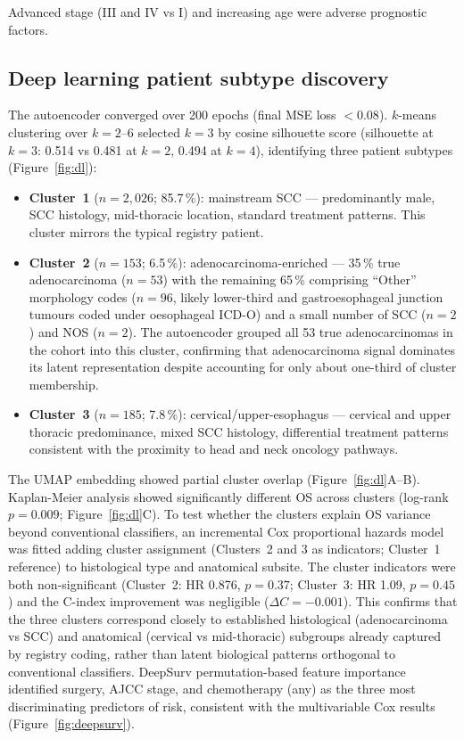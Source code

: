 \documentclass[12pt,a4paper]{article}
\begin{document}
Advanced stage (III and IV vs I) and increasing age were adverse
prognostic factors.

\subsection{Deep learning patient subtype discovery}
\label{sec:dl}
The autoencoder converged over 200 epochs (final MSE loss $< 0.08$).
$k$-means clustering over $k = 2$--6 selected $k = 3$ by cosine
silhouette score (silhouette at $k = 3$: 0.514 vs 0.481 at $k = 2$,
0.494 at $k = 4$), identifying three patient subtypes (Figure~\ref{fig:dl}):

\begin{itemize}[noitemsep]
  \item \textbf{Cluster~1} ($n = 2{,}026$; 85.7\,\%): mainstream SCC ---
    predominantly male, SCC histology, mid-thoracic location, standard
    treatment patterns. This cluster mirrors the typical registry
    patient.
  \item \textbf{Cluster~2} ($n = 153$; 6.5\,\%): adenocarcinoma-enriched
    --- 35\,\% true adenocarcinoma ($n = 53$) with the remaining 65\,\%
    comprising ``Other'' morphology codes ($n = 96$, likely lower-third
    and gastroesophageal junction tumours coded under oesophageal ICD-O)
    and a small number of SCC ($n = 2$) and NOS ($n = 2$). The
    autoencoder grouped all 53 true adenocarcinomas in the cohort into
    this cluster, confirming that adenocarcinoma signal dominates its
    latent representation despite accounting for only about one-third of
    cluster membership.
  \item \textbf{Cluster~3} ($n = 185$; 7.8\,\%): cervical/upper-esophagus
    --- cervical and upper thoracic predominance, mixed SCC histology,
    differential treatment patterns consistent with the proximity to head
    and neck oncology pathways.
\end{itemize}

\noindent
The UMAP embedding showed partial cluster overlap (Figure~\ref{fig:dl}A--B).
Kaplan-Meier analysis showed significantly different OS across clusters
(log-rank $p = 0.009$; Figure~\ref{fig:dl}C). To test whether the clusters
explain OS variance beyond conventional classifiers, an incremental Cox
proportional hazards model was fitted adding cluster assignment
(Clusters~2 and 3 as indicators; Cluster~1 reference) to histological
type and anatomical subsite. The cluster indicators were both
non-significant (Cluster~2: HR 0.876, $p = 0.37$;
Cluster~3: HR 1.09, $p = 0.45$) and the C-index improvement was
negligible ($\Delta C = -0.001$). This confirms that the three clusters
correspond closely to established histological (adenocarcinoma vs SCC)
and anatomical (cervical vs mid-thoracic) subgroups already captured by
registry coding, rather than latent biological patterns orthogonal to
conventional classifiers. DeepSurv permutation-based feature importance
identified surgery, AJCC stage, and chemotherapy (any) as the three most discriminating
predictors of risk, consistent with the multivariable Cox results
(Figure~\ref{fig:deepsurv}).
\end{document}
